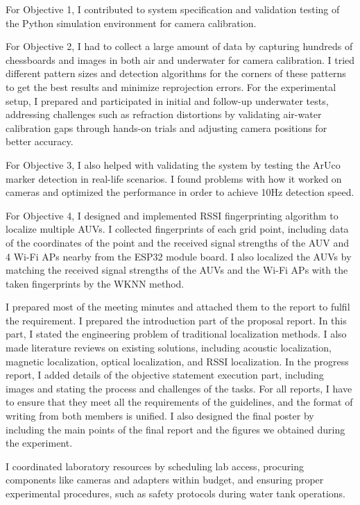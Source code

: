 \documentclass[11pt]{article}
\begin{document}
\begin{itemize}
        For Objective 1, I contributed to system specification and validation testing of the Python simulation environment for camera calibration.
    
        For Objective 2, I had to collect a large amount of data by capturing hundreds of chessboards and images in both air and underwater for camera calibration. I tried different pattern sizes and detection algorithms for the corners of these patterns to get the best results and minimize reprojection errors. For the experimental setup, I prepared and participated in initial and follow-up underwater tests, addressing challenges such as refraction distortions by validating air-water calibration gaps through hands-on trials and adjusting camera positions for better accuracy.

        For Objective 3, I also helped with validating the system by testing the ArUco marker detection in real-life scenarios. I found problems with how it worked on cameras and optimized the performance in order to achieve 10Hz detection speed.

        For Objective 4, I designed and implemented RSSI fingerprinting algorithm to localize multiple AUVs. I collected fingerprints of each grid point, including data of the coordinates of the point and the received signal strengths of the AUV and 4 Wi-Fi APs nearby from the ESP32 module board. I also localized the AUVs by matching the received signal strengths of the AUVs and the Wi-Fi APs with the taken fingerprints by the WKNN method.
    
        I prepared most of the meeting minutes and attached them to the report to fulfil the requirement. I prepared the introduction part of the proposal report. In this part, I stated the engineering problem of traditional localization methods. I also made literature reviews on existing solutions, including acoustic localization, magnetic localization, optical localization, and RSSI localization. In the progress report, I added details of the objective statement execution part, including images and stating the process and challenges of the tasks. For all reports, I have to ensure that they meet all the requirements of the guidelines, and the format of writing from both members is unified. I also designed the final poster by including the main points of the final report and the figures we obtained during the experiment.
    
        I coordinated laboratory resources by scheduling lab access, procuring components like cameras and adapters within budget, and ensuring proper experimental procedures, such as safety protocols during water tank operations.
    

\end{itemize}
\end{document}
